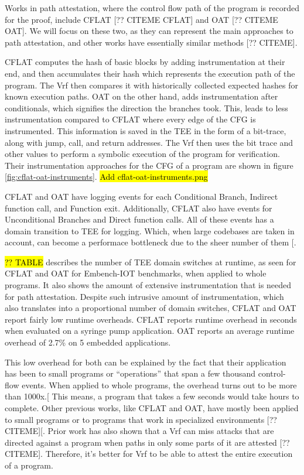\documentclass[a4paper, nobind]{templates/ociamthesis}
\begin{document}
Works in path attestation, where the control flow path of the program is recorded
for the proof, include CFLAT {[}?? CITEME CFLAT{]} and OAT {[}?? CITEME OAT{]}.
We will focus on these two, as they can represent the main approaches to path
attestation, and other works have essentially similar methods {[}?? CITEME{]}.

CFLAT computes the hash of basic blocks by adding instrumentation at their end,
and then accumulates their hash which represents the execution path of the program.
The Vrf then compares it with historically collected expected hashes for known
execution paths.
OAT on the other hand, adds instrumentation after conditionals, which signifies
the direction the branches took. This, leads to less instrumentation compared to
CFLAT where every edge of the CFG is instrumented.
This information is saved in the TEE in the form of a bit-trace, along with
jump, call, and return addresses.
The Vrf then uses the bit trace and other values to perform a symbolic execution
of the program for verification.
Their instrumentation approaches for the CFG of a program
are shown in figure \ref{fig:cflat-oat-instruments}.
\hl{Add cflat-oat-instruments.png}

CFLAT and OAT have logging events for each Conditional Branch, Indirect function call, and Function exit.
Additionally, CFLAT also have events for Unconditional Branches and Direct function calls.
All of these events has a domain transition to TEE for logging. Which, when large codebases
are taken in account, can become a performace bottleneck due to the sheer number of them {[}\citeproc{ref-blast}{25}{]}.

\hl{?? TABLE} describes the number of TEE domain switches at runtime,
as seen for CFLAT and OAT for Embench-IOT benchmarks, when applied to whole programs.
It also shows the amount of extensive instrumentation that is needed for path attestation.
Despite such intrusive amount of instrumentation, which also translates into
a proportional number of domain switches, CFLAT and OAT report fairly low runtime overheads.
CFLAT reports runtime overhead in seconds when evaluated on a syringe pump application.
OAT reports an average runtime overhead of 2.7\% on 5 embedded applications.

This low overhead for both can be explained by the fact that their application
has been to small programs or ``operations'' that span a few thousand control-flow events.
When applied to whole programs, the overhead turns out to be more than 1000x.{[}\citeproc{ref-blast}{25}{]}
This means, a program that takes a few seconds would take hours to complete.
Other previous works, like CFLAT and OAT, have mostly been applied to small
programs or to programs that work in specialized environments {[}?? CITEME{]}{[}\citeproc{ref-blast}{25}{]}.
Prior work has also shown that a Vrf can miss attacks that are directed against
a program when paths in only some parts of it are attested {[}?? CITEME{]}.
Therefore, it's better for Vrf to be able to attest the entire execution of a program.
\end{document}
